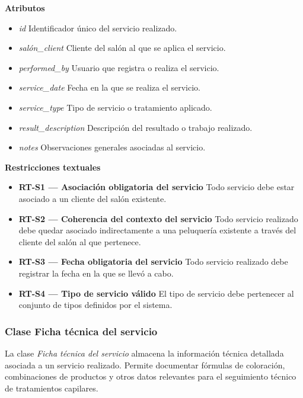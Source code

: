 \textbf{Atributos}

\begin{itemize}

      \item \textit{id}
            Identificador único del servicio realizado.
      \item \textit{salón\_client}
            Cliente del salón al que se aplica el servicio.
      \item \textit{performed\_by}
            Usuario que registra o realiza el servicio.
      \item \textit{service\_date}
            Fecha en la que se realiza el servicio.
      \item \textit{service\_type}
            Tipo de servicio o tratamiento aplicado.
      \item \textit{result\_description}
            Descripción del resultado o trabajo realizado.
      \item \textit{notes}
            Observaciones generales asociadas al servicio.

\end{itemize}

\textbf{Restricciones textuales}

\begin{itemize}

      \item \textbf{RT-S1 — Asociación obligatoria del servicio}
            Todo servicio debe estar asociado a un cliente del salón existente.
      \item \textbf{RT-S2 — Coherencia del contexto del servicio}
            Todo servicio realizado debe quedar asociado indirectamente a una peluquería existente a través del cliente del salón al que pertenece.
      \item \textbf{RT-S3 — Fecha obligatoria del servicio}
            Todo servicio realizado debe registrar la fecha en la que se llevó a cabo.
      \item \textbf{RT-S4 — Tipo de servicio válido}
            El tipo de servicio debe pertenecer al conjunto de tipos definidos por el sistema.

\end{itemize}

\subsubsection{Clase Ficha técnica del servicio}

La clase \textit{Ficha técnica del servicio} almacena la información técnica detallada asociada a un servicio realizado. Permite documentar fórmulas de coloración, combinaciones de productos y otros datos relevantes para el seguimiento técnico de tratamientos capilares.

